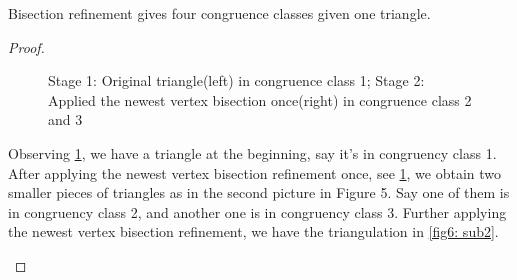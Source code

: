     \begin{lemma*}
    Bisection refinement gives four congruence classes given one triangle.
    \end{lemma*}
    \begin{proof}
    \begin{figure}[h!]
    \centering
    \caption{Stage 1: Original triangle(left) in congruence class 1; Stage 2: Applied the newest vertex bisection once(right) in congruence class 2 and 3}
    \label{fig6: sub1}
    \end{figure}

    Observing \ref{fig6: sub1}, we have a triangle at the beginning, say it's in congruency class 1. After applying the newest vertex bisection refinement once, see \ref{fig6: sub1}, we obtain two smaller pieces of triangles as in the second picture in Figure 5. Say one of them is in congruency class 2, and another one is in congruency class 3. Further applying the newest vertex bisection refinement, we have the triangulation in \ref{fig6: sub2}.

    \begin{figure}[h!]
    \centering
\end{figure}
\end{proof}
